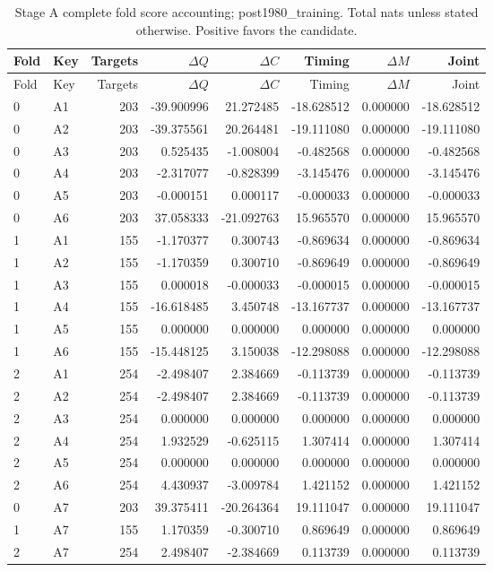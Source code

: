 {\small
\setlength{\tabcolsep}{3pt}
\begin{longtable}{llrrrrrr}
\caption{Stage A complete fold score accounting; post1980\_training. Total nats unless stated otherwise. Positive favors the candidate.}\label{tab:A-post1980_training}\\
\toprule
Fold & Key & Targets & $\Delta Q$ & $\Delta C$ & Timing & $\Delta M$ & Joint\\\midrule
\endfirsthead
\toprule
Fold & Key & Targets & $\Delta Q$ & $\Delta C$ & Timing & $\Delta M$ & Joint\\\midrule
\endhead
0 & A1 & 203 & -39.900996 & 21.272485 & -18.628512 & 0.000000 & -18.628512\\
0 & A2 & 203 & -39.375561 & 20.264481 & -19.111080 & 0.000000 & -19.111080\\
0 & A3 & 203 & 0.525435 & -1.008004 & -0.482568 & 0.000000 & -0.482568\\
0 & A4 & 203 & -2.317077 & -0.828399 & -3.145476 & 0.000000 & -3.145476\\
0 & A5 & 203 & -0.000151 & 0.000117 & -0.000033 & 0.000000 & -0.000033\\
0 & A6 & 203 & 37.058333 & -21.092763 & 15.965570 & 0.000000 & 15.965570\\
1 & A1 & 155 & -1.170377 & 0.300743 & -0.869634 & 0.000000 & -0.869634\\
1 & A2 & 155 & -1.170359 & 0.300710 & -0.869649 & 0.000000 & -0.869649\\
1 & A3 & 155 & 0.000018 & -0.000033 & -0.000015 & 0.000000 & -0.000015\\
1 & A4 & 155 & -16.618485 & 3.450748 & -13.167737 & 0.000000 & -13.167737\\
1 & A5 & 155 & 0.000000 & 0.000000 & 0.000000 & 0.000000 & 0.000000\\
1 & A6 & 155 & -15.448125 & 3.150038 & -12.298088 & 0.000000 & -12.298088\\
2 & A1 & 254 & -2.498407 & 2.384669 & -0.113739 & 0.000000 & -0.113739\\
2 & A2 & 254 & -2.498407 & 2.384669 & -0.113739 & 0.000000 & -0.113739\\
2 & A3 & 254 & 0.000000 & 0.000000 & 0.000000 & 0.000000 & 0.000000\\
2 & A4 & 254 & 1.932529 & -0.625115 & 1.307414 & 0.000000 & 1.307414\\
2 & A5 & 254 & 0.000000 & 0.000000 & 0.000000 & 0.000000 & 0.000000\\
2 & A6 & 254 & 4.430937 & -3.009784 & 1.421152 & 0.000000 & 1.421152\\
0 & A7 & 203 & 39.375411 & -20.264364 & 19.111047 & 0.000000 & 19.111047\\
1 & A7 & 155 & 1.170359 & -0.300710 & 0.869649 & 0.000000 & 0.869649\\
2 & A7 & 254 & 2.498407 & -2.384669 & 0.113739 & 0.000000 & 0.113739\\
\bottomrule
\end{longtable}
}

